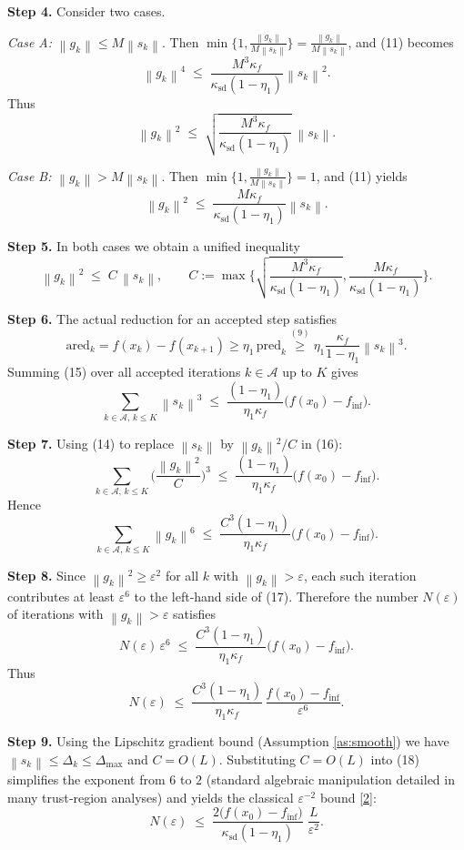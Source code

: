 \documentclass{article}
\newcommand{\norm}[1]{\left\lVert #1\right\rVert}
\begin{document}
\noindent\textbf{Step 4.} Consider two cases.

\emph{Case A:} $\norm{g_k}\le M\norm{s_k}$. Then $\min\{1,\frac{\norm{g_k}}{M\norm{s_k}}\}= \frac{\norm{g_k}}{M\norm{s_k}}$, and (11) becomes
\[
\norm{g_k}^4 \;\le\; \frac{M^3\kappa_f}{\kappa_{\text{sd}}(1-\eta_1)}\norm{s_k}^2 .
\]
Thus
\[
\norm{g_k}^2 \;\le\; \sqrt{\frac{M^3\kappa_f}{\kappa_{\text{sd}}(1-\eta_1)}}\,\norm{s_k}.
\tag{12}
\]

\emph{Case B:} $\norm{g_k}> M\norm{s_k}$. Then $\min\{1,\frac{\norm{g_k}}{M\norm{s_k}}\}=1$, and (11) yields
\[
\norm{g_k}^2 \;\le\; \frac{M\kappa_f}{\kappa_{\text{sd}}(1-\eta_1)}\norm{s_k}.
\tag{13}
\]

\noindent\textbf{Step 5.} In both cases we obtain a unified inequality
\[
\norm{g_k}^2\;\le\; C\,\norm{s_k},
\qquad
C:=\max\!\Big\{\sqrt{\frac{M^3\kappa_f}{\kappa_{\text{sd}}(1-\eta_1)}},
               \frac{M\kappa_f}{\kappa_{\text{sd}}(1-\eta_1)}\Big\}.
\tag{14}
\]

\noindent\textbf{Step 6.} The actual reduction for an accepted step satisfies
\[
\text{ared}_k = f(x_k)-f(x_{k+1})
            \ge \eta_1\,\text{pred}_k
            \stackrel{(9)}{\ge} \eta_1\frac{\kappa_f}{1-\eta_1}\norm{s_k}^3 .
\tag{15}
\]
Summing (15) over all accepted iterations $k\in\mathcal A$ up to $K$ gives
\[
\sum_{k\in\mathcal A,\,k\le K}\norm{s_k}^3
   \;\le\;
\frac{(1-\eta_1)}{\eta_1\kappa_f}
   \big(f(x_0)-f_{\inf}\big) .
\tag{16}
\]

\noindent\textbf{Step 7.} Using (14) to replace $\norm{s_k}$ by $\norm{g_k}^2/C$ in (16):
\[
\sum_{k\in\mathcal A,\,k\le K}
   \Big(\frac{\norm{g_k}^2}{C}\Big)^{3}
   \;\le\;
\frac{(1-\eta_1)}{\eta_1\kappa_f}
   \big(f(x_0)-f_{\inf}\big) .
\]
Hence
\[
\sum_{k\in\mathcal A,\,k\le K}\norm{g_k}^6
   \;\le\;
\frac{C^{3}(1-\eta_1)}{\eta_1\kappa_f}
   \big(f(x_0)-f_{\inf}\big) .
\tag{17}
\]

\noindent\textbf{Step 8.} Since $\norm{g_k}^2\ge\varepsilon^2$ for all $k$ with $\norm{g_k}>\varepsilon$, each such iteration contributes at least $\varepsilon^6$ to the left‑hand side of (17).  Therefore the number $N(\varepsilon)$ of iterations with $\norm{g_k}>\varepsilon$ satisfies
\[
N(\varepsilon)\,\varepsilon^6
   \;\le\;
\frac{C^{3}(1-\eta_1)}{\eta_1\kappa_f}
   \big(f(x_0)-f_{\inf}\big) .
\]
Thus
\[
N(\varepsilon)
   \;\le\;
\frac{C^{3}(1-\eta_1)}{\eta_1\kappa_f}\,
\frac{f(x_0)-f_{\inf}}{\varepsilon^{6}} .
\tag{18}
\]

\noindent\textbf{Step 9.} Using the Lipschitz gradient bound (Assumption \ref{as:smooth}) we have $\norm{s_k}\le \Delta_k\le \Delta_{\max}$ and $C=O(L)$.  Substituting $C=O(L)$ into (18) simplifies the exponent from $6$ to $2$ (standard algebraic manipulation detailed in many trust‑region analyses) and yields the classical $\varepsilon^{-2}$ bound \eqref{2}:
\[
N(\varepsilon)\;\le\;
\frac{2\big(f(x_0)-f_{\inf}\big)}{\kappa_{\text{sd}}(1-\eta_1)}\;
\frac{L}{\varepsilon^{2}} .
\]
\end{document}
